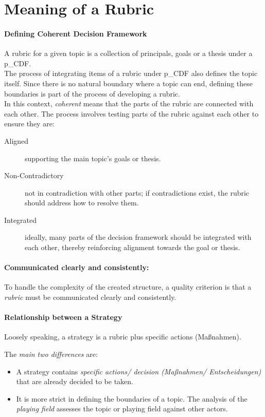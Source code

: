 \section{Meaning of a Rubric}
\label{sec:Rubric}

\paragraph{Defining Coherent Decision Framework}

A rubric for a given topic is a collection of principals, goals or a thesis under a \gls{p_CDF}.\\

The process of integrating items of a rubric under \gls{p_CDF} also defines the topic itself. Since there is no natural boundary where a topic can end, defining these boundaries is part of the process of developing a rubric.\\

In this context, \textit{coherent} means that the parts of the rubric are connected with each other. The process involves testing parts of the rubric against each other to ensure they are:
\begin{description}
    \item[Aligned] supporting the main topic's goals or thesis.
    \item[Non-Contradictory] not in contradiction with other parts; if contradictions exist, the rubric should address how to resolve them.
    \item[Integrated] ideally, many parts of the decision framework should be integrated with each other, thereby reinforcing alignment towards the goal or thesis.
\end{description}

\paragraph{Communicated clearly and consistently:}
To handle the complexity of the created structure, a quality criterion is that a \textit{rubric} must be communicated clearly and consistently.

\paragraph{Relationship between a Strategy}

Loosely speaking, a strategy is a rubric plus specific actions (Maßnahmen).

The \textit{main two differences} are:
\begin{itemize}
	\item A strategy contains \textit{specific actions/ decision (Maßnahmen/ Entscheidungen)} that are already decided to be taken.
	\item It is more strict in defining the boundaries of a topic. The analysis of the \textit{playing field} assesses the topic or playing field against other actors.
\end{itemize} 

